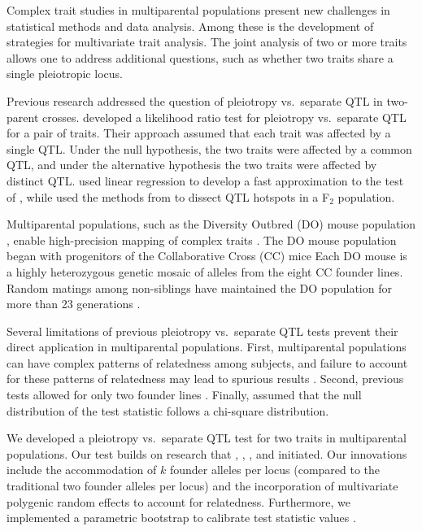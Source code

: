 \documentclass[oneside]{book}\usepackage[]{graphicx}\usepackage[]{color}
\begin{document}
Complex trait studies in multiparental populations present new
challenges in statistical methods and data analysis. Among these is
the development of strategies for multivariate trait analysis. The
joint analysis of two or more traits allows one to address additional
questions, such as whether two traits share a single pleiotropic
locus.




Previous research addressed the question of pleiotropy vs.\ separate
QTL in two-parent crosses.
\citet{jiang1995multiple} developed a likelihood
ratio test for pleiotropy vs.\ separate QTL for a pair of traits.
Their approach assumed that each trait was affected by a single QTL.
Under the null hypothesis, the two traits were affected by a common
QTL, and under the alternative hypothesis the two traits were affected
by distinct QTL.
\citet{knott2000multitrait} used linear regression to develop a fast
approximation to the test of \citet{jiang1995multiple}, while
\citet{tian2016dissection} used the methods from
\citet{knott2000multitrait} to dissect QTL hotspots in a F$_2$
population.


Multiparental populations, such
as the Diversity Outbred (DO) mouse population \citep{churchill2012diversity}, enable high-precision
mapping of complex traits \citep{de2014genetics}. The DO
mouse population began with progenitors of the Collaborative
Cross (CC) mice \citep{churchill2004collaborative}
Each DO mouse is a highly heterozygous genetic mosaic
of alleles from the eight CC founder lines. Random
matings among non-siblings have maintained the DO
population for more than 23 generations \citep{chesler2016diversity}.

Several limitations of previous pleiotropy vs.\ separate QTL tests
prevent their direct application in multiparental populations. First,
multiparental populations can have complex patterns of relatedness
among subjects, and failure to account for these patterns of
relatedness may lead to spurious results \citep{yang2014advantages}.
Second, previous tests allowed for only two founder lines
\citep{jiang1995multiple}. Finally, \citet{jiang1995multiple} assumed
that the null distribution of the test statistic follows a chi-square
distribution.

We developed a pleiotropy vs.\ separate QTL test for two traits in
multiparental populations. Our test builds on research that
\citet{jiang1995multiple}, \citet{knott2000multitrait},
\citet{tian2016dissection}, and \citet{zhou2014efficient} initiated.
Our innovations include the accommodation of $k$ founder alleles per
locus (compared to the traditional two founder alleles per locus) and
the incorporation of multivariate polygenic random effects to account
for relatedness. Furthermore, we implemented a parametric bootstrap to
calibrate test statistic values \citep{efron1979,tian2016dissection}.
\end{document}

